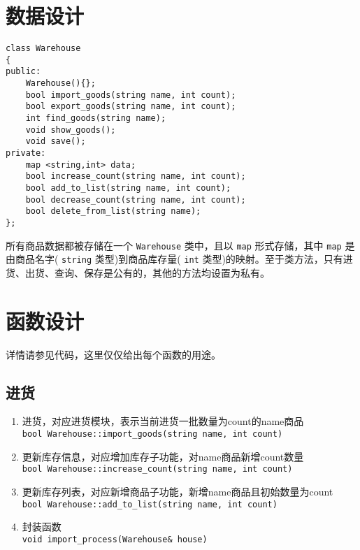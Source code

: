 \documentclass[11pt,UTF8]{ctexart}
\begin{document}
\section{数据设计}
\begin{lstlisting}
class Warehouse
{
public:
	Warehouse(){};
	bool import_goods(string name, int count);
	bool export_goods(string name, int count);
	int find_goods(string name);
	void show_goods();
	void save();
private:
	map <string,int> data;
	bool increase_count(string name, int count);
	bool add_to_list(string name, int count);
	bool decrease_count(string name, int count);
	bool delete_from_list(string name);
};
\end{lstlisting}
\par 所有商品数据都被存储在一个 \verb'Warehouse' 类中，且以 \verb'map' 形式存储，其中 \verb'map' 是由商品名字( \verb'string' 类型)到商品库存量( \verb'int' 类型)的映射。至于类方法，只有进货、出货、查询、保存是公有的，其他的方法均设置为私有。


\section{函数设计}
\par 详情请参见代码，这里仅仅给出每个函数的用途。
\subsection{进货}
\begin{enumerate}
	\item 进货，对应进货模块，表示当前进货一批数量为count的name商品\\
\verb'bool Warehouse::import_goods(string name, int count)'
	\item 更新库存信息，对应增加库存子功能，对name商品新增count数量\\
\verb'bool Warehouse::increase_count(string name, int count)'
	\item 更新库存列表，对应新增商品子功能，新增name商品且初始数量为count\\
\verb'bool Warehouse::add_to_list(string name, int count)'
	\item 封装函数\\
\verb'void import_process(Warehouse& house)'
\end{enumerate}
\end{document}
